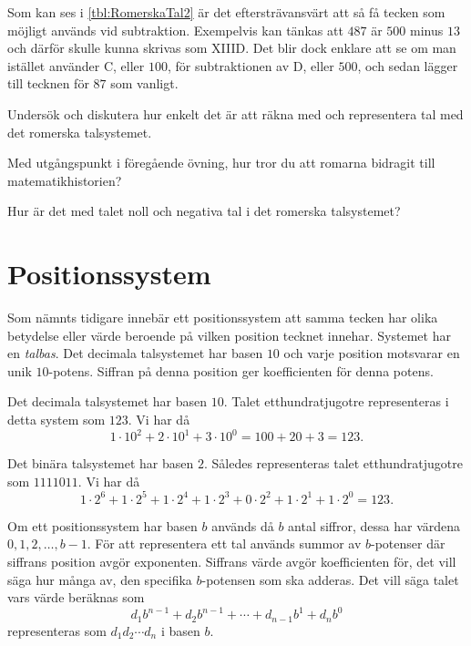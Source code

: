 Som kan ses i \cref{tbl:RomerskaTal2} är det eftersträvansvärt att så få
tecken som möjligt används vid subtraktion.
Exempelvis kan tänkas att \(487\) är \(500\) minus \(13\) och därför skulle
kunna skrivas som XIIID.\@
Det blir dock enklare att se om man istället använder C, eller \(100\), för
subtraktionen av D, eller \(500\), och sedan lägger till tecknen för \(87\)
som vanligt.

\begin{exercise}\label{xrc:RaknaMedRomerskaTal}
  Undersök och diskutera hur enkelt det är att räkna med och
  representera tal med det romerska talsystemet.
\end{exercise}
\begin{exercise}
  Med utgångspunkt i föregående övning, hur tror du att romarna bidragit till
  matematikhistorien?
\end{exercise}
\begin{exercise}
  Hur är det med talet noll och negativa tal i det romerska talsystemet?
\end{exercise}



\section{Positionssystem}%
%
\label{sec:Positionssystem}
Som nämnts tidigare innebär ett positionssystem att samma tecken
har olika betydelse eller värde beroende på vilken position tecknet innehar.
Systemet har en \emph{talbas}.
Det decimala talsystemet har basen \(10\) och varje position motsvarar en
unik \(10\)-potens.
Siffran på denna position ger koefficienten för denna potens.

\begin{example}\label{ex:DecimaltPosistionssystem}
  Det decimala talsystemet har basen \(10\).
  Talet etthundratjugotre representeras i detta system som \(123\).
  Vi har då
  \[1\cdot10^2 + 2\cdot10^1 + 3\cdot10^0 = 100 + 20 + 3 = 123.\]
\end{example}
\begin{example}\label{ex:BinartPositionssystem}
  Det binära talsystemet har basen \(2\).
  Således representeras talet etthundratjugotre som \(1111011\).
  Vi har då
  \[1\cdot2^6 + 1\cdot2^5 + 1\cdot 2^4 + 1\cdot2^3 + 0\cdot2^2 +
  1\cdot2^1 + 1\cdot2^0 = 123.\]
\end{example}
\begin{example}
  Om ett positionssystem har basen \(b\) används då \(b\) antal siffror,
  dessa har värdena \(0, 1, 2, \ldots, b-1\).
  För att representera ett tal används summor av \(b\)-potenser där siffrans
  position avgör exponenten.
  Siffrans värde avgör koefficienten för, det vill säga hur många av, den
  specifika \(b\)-potensen som ska adderas.
  Det vill säga talet vars värde beräknas som
  \[
    d_1 b^{n-1} + d_2 b^{n-1} + \cdots + d_{n-1} b^1 + d_n b^0
  \]
  representeras som \(d_1d_2\cdots d_n\) i basen \(b\).
\end{example}


